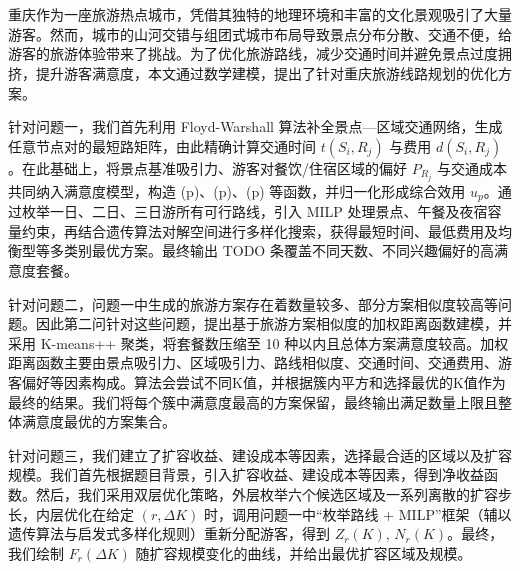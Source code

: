 \begin{cabstract}	%
\vspace*{-2\baselineskip}   %
\begin{center}
  \\[0.8em]
\end{center}

\begin{center}
  \\[0.8em]
\end{center}

重庆作为一座旅游热点城市，凭借其独特的地理环境和丰富的文化景观吸引了大量游客。然而，城市的山河交错与组团式城市布局导致景点分布分散、交通不便，给游客的旅游体验带来了挑战。为了优化旅游路线，减少交通时间并避免景点过度拥挤，提升游客满意度，本文通过数学建模，提出了针对重庆旅游线路规划的优化方案。

针对问题一，我们首先利用 Floyd-Warshall 算法补全景点—区域交通网络，生成任意节点对的最短路矩阵，由此精确计算交通时间 \(t(S_i,R_j)\) 与费用 \(d(S_i,R_j)\)。在此基础上，将景点基准吸引力、游客对餐饮/住宿区域的偏好 \(P_{R_j}\) 与交通成本共同纳入满意度模型，构造 (p)、(p)、(p) 等函数，并归一化形成综合效用 \(u_p\)。通过枚举一日、二日、三日游所有可行路线，引入 MILP 处理景点、午餐及夜宿容量约束，再结合遗传算法对解空间进行多样化搜索，获得最短时间、最低费用及均衡型等多类别最优方案。最终输出 TODO 条覆盖不同天数、不同兴趣偏好的高满意度套餐。

针对问题二，问题一中生成的旅游方案存在着数量较多、部分方案相似度较高等问题。因此第二问针对这些问题，提出基于旅游方案相似度的加权距离函数建模，并采用 K-means++ 聚类，将套餐数压缩至 10 种以内且总体方案满意度较高。加权距离函数主要由景点吸引力、区域吸引力、路线相似度、交通时间、交通费用、游客偏好等因素构成。算法会尝试不同K值，并根据簇内平方和选择最优的K值作为最终的结果。我们将每个簇中满意度最高的方案保留，最终输出满足数量上限且整体满意度最优的方案集合。

针对问题三，我们建立了扩容收益、建设成本等因素，选择最合适的区域以及扩容规模。我们首先根据题目背景，引入扩容收益、建设成本等因素，得到净收益函数。然后，我们采用双层优化策略，外层枚举六个候选区域及一系列离散的扩容步长，内层优化在给定 $(r,\Delta K)$ 时，调用问题一中“枚举路线 + MILP”框架（辅以遗传算法与启发式多样化规则）重新分配游客，得到 $Z_r(K),\,N_r(K)$。最终，我们绘制 $F_r(\Delta K)$ 随扩容规模变化的曲线，并给出最优扩容区域及规模。
\end{cabstract}

